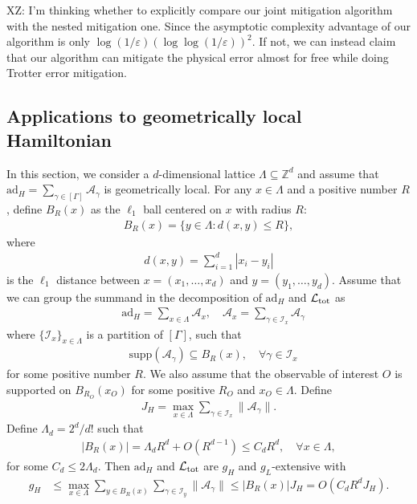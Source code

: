\documentclass[11pt]{article}
\renewcommand{\L}{\mathcal{L}}
\newcommand{\ad}{\mathrm{ad}}
\newcommand{\A}{\mathcal{A}}
\newcommand{\supp}{\mathrm{supp}}
\newcommand{\eps}{\varepsilon}
\newcommand{\mc}{\mathcal}
\newcommand{\xz}[1]{{\color{cyan} XZ: #1}}
\begin{document}
\xz{I'm thinking whether to explicitly compare our joint mitigation algorithm with the nested mitigation one. Since the asymptotic complexity advantage of our algorithm is only $\log(1/\eps)(\log\log(1/\eps))^2$. If not, we can instead claim that our algorithm can mitigate the physical error almost for free while doing Trotter error mitigation. }


\subsection{Applications to geometrically local Hamiltonian}
\label{sec:geo-local}
In this section, we consider a $d$-dimensional lattice $\Lambda \subseteq \mathbb{Z}^d$ and assume that $\ad_H = \sum_{\gamma\in [\Gamma]} \A_{\gamma}$ is geometrically local. 
For any $x\in \Lambda$ and a positive number $R$, define $B_R(x)$ as the $\ell_1$ ball centered on $x$ with radius $R$: \begin{align*}
    B_R(x) = \{ y\in \Lambda:d(x,y) \le R\},
\end{align*}
where \begin{align*}
    d(x,y) = \sum_{i=1}^d  |x_i-y_i|
\end{align*}
is the $\ell_1$ distance between $x = (x_1, \ldots, x_d)$ and $y= (y_1, \ldots, y_d)$. 
Assume that we can group the summand in the decomposition of $\ad_H$ and $\L_{\rm tot}$ as \begin{align*}
    &\ad_H = \sum_{x\in {\Lambda}} \A_x, \quad \A_x = \sum_{\gamma\in \mc I_x} \A_{\gamma} 
\end{align*} where $\{\mc I_x\}_{x\in \Lambda}$ is a partition of $[\Gamma]$, such that \begin{align*}
    &\supp(\A_{\gamma}) \subseteq B_R(x), \quad \forall \gamma\in \mc I_x
\end{align*} for some positive number $R$. We also assume that the observable of interest $O$ is supported on $B_{R_O}(x_O)$ for some positive $R_O$ and $x_O\in \Lambda$. Define \begin{align*}
    J_H = \max_{x\in \Lambda}\sum_{\gamma\in \mc I_x} \|\A_{\gamma}\|.
\end{align*} Define $\Lambda_d = 2^d/d!$ such that \begin{align*}
    |B_R(x)| = \Lambda_dR^d + O(R^{d-1})\le C_d R^d, \quad \forall x\in \Lambda,
\end{align*}
for some $C_d\le 2\Lambda_d$.
Then $\ad_H$ and $\L_{\rm tot}$ are $g_H$ and $g_L$-extensive with \begin{align*}
    g_H &\le \max_{x\in \Lambda} \sum_{y\in B_R(x)}\sum_{\gamma\in \mc I_y} \|\A_{\gamma}\|\le |B_R(x)|J_H  = O(C_d R^d J_H).
\end{align*}
\end{document}
